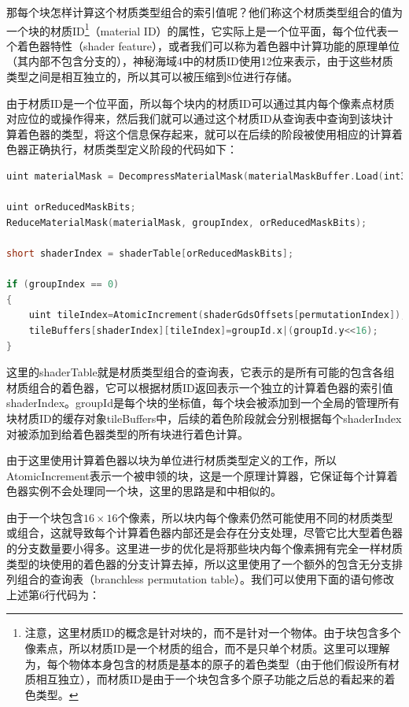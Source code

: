那每个块怎样计算这个材质类型组合的索引值呢？他们称这个材质类型组合的值为一个块的材质ID\footnote{注意，这里材质ID的概念是针对块的，而不是针对一个物体。由于块包含多个像素点，所以材质ID是一个材质的组合，而不是只单个材质。这里可以理解为，每个物体本身包含的材质是基本的原子的着色类型（由于他们假设所有材质相互独立），而材质ID是由于一个块包含多个原子功能之后总的看起来的着色类型。}（material ID）的属性，它实际上是一个位平面，每个位代表一个着色器特性（shader feature），或者我们可以称为着色器中计算功能的原理单位（其内部不包含分支的），神秘海域4中的材质ID使用12位来表示，由于这些材质类型之间是相互独立的，所以其可以被压缩到8位进行存储。

由于材质ID是一个位平面，所以每个块内的材质ID可以通过其内每个像素点材质对应位的或操作得来，然后我们就可以通过这个材质ID从查询表中查询到该块计算着色器的类型，将这个信息保存起来，就可以在后续的阶段被使用相应的计算着色器正确执行，材质类型定义阶段的代码如下：

\begin{lstlisting}[language=C++]
uint materialMask = DecompressMaterialMask(materialMaskBuffer.Load(int3(screenCoord, 0)));

uint orReducedMaskBits;
ReduceMaterialMask(materialMask, groupIndex, orReducedMaskBits);

short shaderIndex = shaderTable[orReducedMaskBits];

if (groupIndex == 0)
{
	uint tileIndex=AtomicIncrement(shaderGdsOffsets[permutationIndex]);
	tileBuffers[shaderIndex][tileIndex]=groupId.x|(groupId.y<<16);
}
\end{lstlisting}

这里的shaderTable就是材质类型组合的查询表，它表示的是所有可能的包含各组材质组合的着色器，它可以根据材质ID返回表示一个独立的计算着色器的索引值shaderIndex。groupId是每个块的坐标值，每个块会被添加到一个全局的管理所有块材质ID的缓存对象tileBuffers中，后续的着色阶段就会分别根据每个shaderIndex对被添加到给着色器类型的所有块进行着色计算。

由于这里使用计算着色器以块为单位进行材质类型定义的工作，所以AtomicIncrement表示一个被申领的块，这是一个原理计算器，它保证每个计算着色器实例不会处理同一个块，这里的思路是和\cite{a:SPU-basedDeferredShadingforBattlefield3onPlaystation3}中相似的。

由于一个块包含$16\times 16$个像素，所以块内每个像素仍然可能使用不同的材质类型或组合，这就导致每个计算着色器内部还是会存在分支处理，尽管它比大型着色器的分支数量要小得多。这里进一步的优化是将那些块内每个像素拥有完全一样材质类型的块使用的着色器的分支计算去掉，所以这里使用了一个额外的包含无分支排列组合的查询表（branchless permutation table）。我们可以使用下面的语句修改上述第6行代码为：

